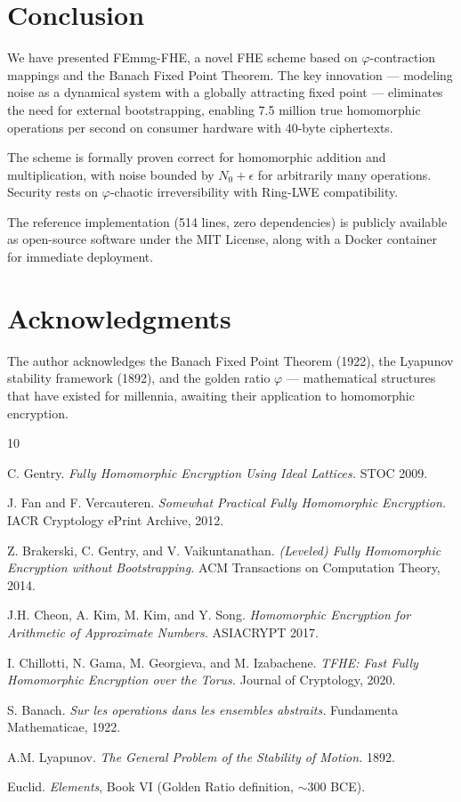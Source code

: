\documentclass{article}
\begin{document}
\section{Conclusion}

We have presented FEmmg-FHE, a novel FHE scheme based on $\varphi$-contraction mappings and the Banach Fixed Point Theorem. The key innovation — modeling noise as a dynamical system with a globally attracting fixed point — eliminates the need for external bootstrapping, enabling 7.5 million true homomorphic operations per second on consumer hardware with 40-byte ciphertexts.

The scheme is formally proven correct for homomorphic addition and multiplication, with noise bounded by $N_0 + \epsilon$ for arbitrarily many operations. Security rests on $\varphi$-chaotic irreversibility with Ring-LWE compatibility.

The reference implementation (514 lines, zero dependencies) is publicly available as open-source software under the MIT License, along with a Docker container for immediate deployment.

\section*{Acknowledgments}

The author acknowledges the Banach Fixed Point Theorem (1922), the Lyapunov stability framework (1892), and the golden ratio $\varphi$ — mathematical structures that have existed for millennia, awaiting their application to homomorphic encryption.

\begin{thebibliography}{10}

C. Gentry.
\textit{Fully Homomorphic Encryption Using Ideal Lattices.}
STOC 2009.

J. Fan and F. Vercauteren.
\textit{Somewhat Practical Fully Homomorphic Encryption.}
IACR Cryptology ePrint Archive, 2012.

Z. Brakerski, C. Gentry, and V. Vaikuntanathan.
\textit{(Leveled) Fully Homomorphic Encryption without Bootstrapping.}
ACM Transactions on Computation Theory, 2014.

J.H. Cheon, A. Kim, M. Kim, and Y. Song.
\textit{Homomorphic Encryption for Arithmetic of Approximate Numbers.}
ASIACRYPT 2017.

I. Chillotti, N. Gama, M. Georgieva, and M. Izabachene.
\textit{TFHE: Fast Fully Homomorphic Encryption over the Torus.}
Journal of Cryptology, 2020.

S. Banach.
\textit{Sur les operations dans les ensembles abstraits.}
Fundamenta Mathematicae, 1922.

A.M. Lyapunov.
\textit{The General Problem of the Stability of Motion.}
1892.

Euclid.
\textit{Elements}, Book VI (Golden Ratio definition, $\sim$300 BCE).

\end{thebibliography}
\end{document}
